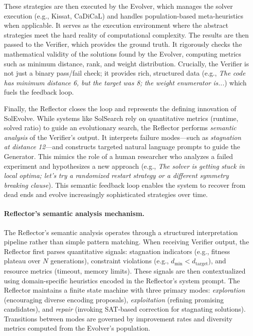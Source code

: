 These strategies are then executed by the Evolver, which manages the solver execution (e.g., Kissat, CaDiCaL) and handles population-based meta-heuristics when applicable. It serves as the execution environment where the abstract strategies meet the hard reality of computational complexity. The results are then passed to the Verifier, which provides the ground truth. It rigorously checks the mathematical validity of the solutions found by the Evolver, computing metrics such as minimum distance, rank, and weight distribution. Crucially, the Verifier is not just a binary pass/fail check; it provides rich, structured data (e.g., \textit{The code has minimum distance 6, but the target was 8; the weight enumerator is...}) which fuels the feedback loop.

Finally, the Reflector closes the loop and represents the defining innovation of SolEvolve. While systems like SolSearch rely on quantitative metrics (runtime, solved ratio) to guide an evolutionary search, the Reflector performs \textit{semantic analysis} of the Verifier's output. It interprets failure modes—such as \textit{stagnation at distance 12}—and constructs targeted natural language prompts to guide the Generator. This mimics the role of a human researcher who analyzes a failed experiment and hypothesizes a new approach (e.g., \textit{The solver is getting stuck in local optima; let's try a randomized restart strategy or a different symmetry breaking clause}). This semantic feedback loop enables the system to recover from dead ends and evolve increasingly sophisticated strategies over time.

\paragraph{Reflector's semantic analysis mechanism.} The Reflector's semantic analysis operates through a structured interpretation pipeline rather than simple pattern matching. When receiving Verifier output, the Reflector first parses quantitative signals: stagnation indicators (e.g., fitness plateau over $N$ generations), constraint violations (e.g., $d_{\min} < d_{\text{target}}$), and resource metrics (timeout, memory limits). These signals are then contextualized using domain-specific heuristics encoded in the Reflector's system prompt. The Reflector maintains a finite state machine with three primary modes: \textit{exploration} (encouraging diverse encoding proposals), \textit{exploitation} (refining promising candidates), and \textit{repair} (invoking SAT-based correction for stagnating solutions). Transitions between modes are governed by improvement rates and diversity metrics computed from the Evolver's population.


